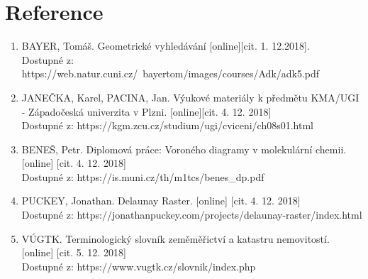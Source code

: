 \documentclass[a4paper, 12pt]{article}
\begin{document}
\section{Reference}

\begin{enumerate}
\item  BAYER, Tomáš. Geometrické vyhledávání [online][cit. 1. 12.2018]. \\
Dostupné z: https://web.natur.cuni.cz/~bayertom/images/courses/Adk/adk5.pdf  \\

\item JANEČKA, Karel, PACINA, Jan. Výukové materiály k předmětu KMA/UGI - Západočeská univerzita v Plzni. [online][cit. 4. 12. 2018]\\
Dostupné z: https://kgm.zcu.cz/studium/ugi/cviceni/ch08s01.html\\

\item BENEŠ, Petr. Diplomová práce: Voroného diagramy v molekulární chemii. [online] [cit. 4. 12. 2018]\\
Dostupné z: https://is.muni.cz/th/m1tcs/benes\_dp.pdf \\

\item PUCKEY, Jonathan. Delaunay Raster. [online] [cit. 4. 12. 2018]\\
Dostupné z: https://jonathanpuckey.com/projects/delaunay-raster/index.html

\item VÚGTK. Terminologický slovník zeměměřictví a katastru nemovitostí. [online] [cit. 5. 12. 2018]\\
Dostupné z: https://www.vugtk.cz/slovnik/index.php \\



\end{enumerate}
\end{document}
